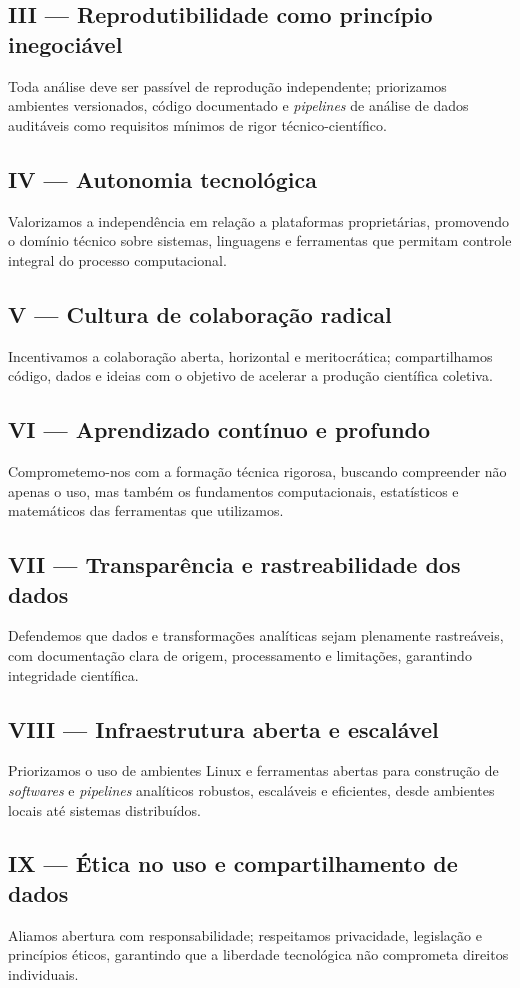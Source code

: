 \documentclass[
  12pt,          %
  a4paper,       %
  oneside,       %
  brazil         %
]{article}
\newenvironment{principio}[1]{%
  \vspace{0.8em}
  \noindent
  \begin{minipage}{\textwidth}
    \subsection*{#1}
    \itshape
}{%
  \end{minipage}
  \vspace{0.5em}
}
\begin{document}
\begin{principio}{III --- Reprodutibilidade como princípio inegociável}
Toda análise deve ser passível de reprodução independente; priorizamos ambientes versionados, código documentado e \textit{pipelines} de análise de dados auditáveis
 como requisitos mínimos de rigor técnico-científico.
\end{principio}

\begin{principio}{IV --- Autonomia tecnológica}
Valorizamos a independência em relação a plataformas proprietárias, promovendo o domínio técnico sobre sistemas, linguagens e ferramentas que 
permitam controle integral do processo computacional.
\end{principio}

\begin{principio}{V --- Cultura de colaboração radical}
Incentivamos a colaboração aberta, horizontal e meritocrática; compartilhamos código, dados e ideias com o objetivo de acelerar a produção científica coletiva.
\end{principio}

\begin{principio}{VI --- Aprendizado contínuo e profundo}
Comprometemo-nos com a formação técnica rigorosa, buscando compreender não apenas o uso, mas também os fundamentos computacionais, 
estatísticos e matemáticos das ferramentas que utilizamos.
\end{principio}

\begin{principio}{VII --- Transparência e rastreabilidade dos dados}
Defendemos que dados e transformações analíticas sejam plenamente rastreáveis, com documentação clara de origem, processamento e limitações, 
garantindo integridade científica.
\end{principio}

\begin{principio}{VIII --- Infraestrutura aberta e escalável}
Priorizamos o uso de ambientes Linux e ferramentas abertas para construção de \textit{softwares} e \textit{pipelines} analíticos robustos, escaláveis e eficientes, 
desde ambientes locais até sistemas distribuídos.
\end{principio}

\begin{principio}{IX --- Ética no uso e compartilhamento de dados}
Aliamos abertura com responsabilidade; respeitamos privacidade, legislação e princípios éticos, garantindo que a liberdade tecnológica não 
comprometa direitos individuais.
\end{principio}
\end{document}
